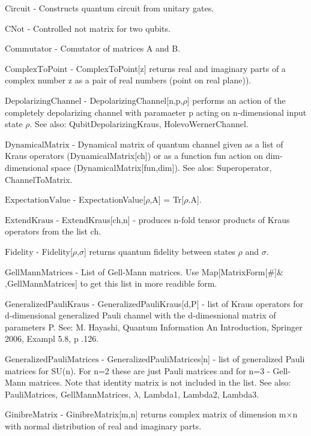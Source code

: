 \documentclass[a4paper,12pt]{article}
\begin{document}
\textbf{$ \text{Circuit} $ } - Constructs quantum circuit from unitary gates.$  $

\textbf{$ \text{CNot} $ } - Controlled not matrix for two qubits.$  $

\textbf{$ \text{Commutator} $ } - Comutator of matrices A and B.$  $

\textbf{$ \text{ComplexToPoint} $ } - ComplexToPoint[z] returns real and imaginary parts of a complex number z as a pair of real numbers (point on real plane)).$  $

\textbf{$ \text{DepolarizingChannel} $ } - DepolarizingChannel[n,p,$\rho $] performs an action of the completely depolarizing channel with paramaeter p acting on n-dimensional input state $\rho $. See also: QubitDepolarizingKraus, HolevoWernerChannel.$  $

\textbf{$ \text{DynamicalMatrix} $ } - Dynamical matrix of quantum channel given as a list of Kraus operators (DynamicalMatrix[ch]) or as a function fun action on dim-dimensional space (DynamicalMatrix[fun,dim]). See alos: Superoperator, ChannelToMatrix.$  $

\textbf{$ \text{ExpectationValue} $ } - ExpectationValue[$\rho $,A] = Tr[$\rho $.A].$  $

\textbf{$ \text{ExtendKraus} $ } - ExtendKraus[ch,n] - produces n-fold tensor products of Kraus operators from the list ch.$  $

\textbf{$ \text{Fidelity} $ } - Fidelity[$\rho $,$\sigma $] returns quantum fidelity between states $\rho $ and $\sigma $.$  $

\textbf{$ \text{GellMannMatrices} $ } - List of Gell-Mann matrices. Use Map[MatrixForm[$\#$]$\&$,GellMannMatrices] to get this list in more readible form.$  $

\textbf{$ \text{GeneralizedPauliKraus} $ } - GeneralizedPauliKraus[d,P] - list of Kraus operators for d-dimensional generalized Pauli channel with the d-dimesnional matrix of parameters P. See: M. Hayashi, Quantum Information An Introduction, Springer 2006, Exampl 5.8, p .126.$  $

\textbf{$ \text{GeneralizedPauliMatrices} $ } - GeneralizedPauliMatrices[n] - list of generalized Pauli matrices for SU(n). For n=2 these are just Pauli matrices and for n=3 - Gell-Mann matrices. Note that identity matrix is not included in the list. See also: PauliMatrices, GellMannMatrices, $\lambda $, Lambda1, Lambda2, Lambda3.$  $

\textbf{$ \text{GinibreMatrix} $ } - GinibreMatrix[m,n] returns complex matrix of dimension m$\times $n with normal distribution of real and imaginary parts.$  $
\end{document}
